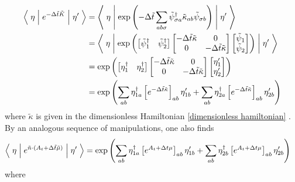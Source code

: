 \begin{align}
		\left\langle\;\eta\;\middle|\; e^{-\Delta \tilde{t} \tilde{K}} \;\middle|\;\eta'\;\right\rangle
	&= 
		\left\langle\;\eta\;\middle|\; \exp\left(-\Delta \tilde{t} \sum_{ab \sigma} \tilde{\psi}^{\dagger}_{\sigma a} \tilde{\kappa}_{ab} \tilde{\psi}_{\sigma b} \right)\;\middle|\;\eta'\;\right\rangle
	\nonumber\\
	&=
		\left\langle\;\eta\;\middle|\; \exp\left(
			\begin{bmatrix} \tilde{\psi}^{\dagger}_{1} &  \tilde{\psi}^{\dagger}_{2}  \end{bmatrix} 
			\begin{bmatrix}
				-\Delta \tilde{t} \tilde{\kappa}	& 0 \\
				0 									& -\Delta \tilde{t} \tilde{\kappa} 
			\end{bmatrix} 
			\begin{bmatrix} \tilde{\psi}_{1} \\  \tilde{\psi}_{2}  \end{bmatrix}
		\right) \;\middle|\;\eta'\;\right\rangle
	\nonumber\\
	& = 
		\exp\left( 
			\begin{bmatrix} {\eta}^{\dagger}_{1} &  {\eta}^{\dagger}_{2}  \end{bmatrix} 
			\begin{bmatrix}
				-\Delta \tilde{t} \tilde{\kappa}	& 0 \\
				0 									& -\Delta \tilde{t} \tilde{\kappa} 
			\end{bmatrix} 
			\begin{bmatrix} {\eta}_{1}' \\  {\eta}_{2}'  \end{bmatrix}
		\right)
	\\
	& = 
		\exp\left( 
			\sum_{ab} \eta^{\dagger}_{1a} \left[e^{-\Delta \tilde{t} \tilde{\kappa}}\right]_{ab} \eta'_{1b}
		+	\sum_{ab} \eta^{\dagger}_{2a} \left[e^{-\Delta \tilde{t} \tilde{\kappa}}\right]_{ab} \eta'_{2b}
		\right)
\end{align}
where $\tilde{\kappa}$ is given in the dimensionless Hamiltonian \eqref{dimensionless hamiltonian} .
By an analogous sequence of manipulations, one also finds
\begin{align}
	\left\langle\;\eta\;\middle|\; e^{\tilde{n} \cdot (A_t + \Delta\tilde{t} \tilde{\mu})} \;\middle|\;\eta'\;\right\rangle
	& = 
	\exp\left( 
		\sum_{ab}\eta^{\dagger}_{1a} \left[e^{A_t + \Delta t \mu}\right]_{ab} \eta'_{1b}
	+	\sum_{ab}\eta^{\dagger}_{2b} \left[e^{A_t + \Delta t \mu}\right]_{ab} \eta'_{2b}
	\right)
\end{align}
where
